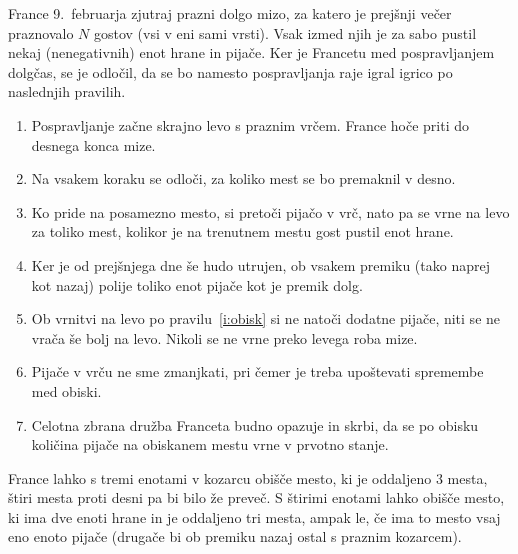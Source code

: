 \documentclass[arhiv]{../izpit}
\begin{document}


\naloga

France 9.~februarja zjutraj prazni dolgo mizo, za katero je prejšnji večer praznovalo $N$ gostov (vsi v eni sami vrsti). Vsak izmed njih je za sabo pustil nekaj (nenegativnih) enot hrane in pijače. Ker je Francetu med pospravljanjem dolgčas, se je odločil, da se bo namesto pospravljanja raje igral igrico po naslednjih pravilih.

\begin{enumerate}
  \item Pospravljanje začne skrajno levo s praznim vrčem.
  France hoče priti do desnega konca mize.
  \item Na vsakem koraku se odloči, za koliko mest se bo premaknil v desno. 
  \item\label{i:obisk} Ko pride na posamezno mesto, si pretoči pijačo v vrč,
  nato pa se vrne na levo za toliko mest, kolikor je na trenutnem mestu gost pustil enot hrane.
  \item Ker je od prejšnjega dne še hudo utrujen, ob vsakem premiku (tako naprej kot nazaj) polije toliko enot pijače kot je premik dolg.
  \item Ob vrnitvi na levo po pravilu~\ref{i:obisk} si ne natoči dodatne pijače, niti se ne vrača še bolj na levo.
  Nikoli se ne vrne preko levega roba mize.
  \item Pijače v vrču ne sme zmanjkati, pri čemer je treba upoštevati spremembe med obiski.
  \item Celotna zbrana družba Franceta budno opazuje in skrbi, da se po obisku količina pijače
  na obiskanem mestu vrne v prvotno stanje.
\end{enumerate}

France lahko s tremi enotami v kozarcu obišče mesto, ki je oddaljeno $3$ mesta, 
štiri mesta proti desni pa bi bilo že preveč. 
S štirimi enotami lahko obišče mesto, ki ima dve enoti hrane in je oddaljeno tri mesta, ampak le, če ima to mesto vsaj eno enoto pijače (drugače bi ob premiku nazaj ostal s praznim kozarcem).
\end{document}
